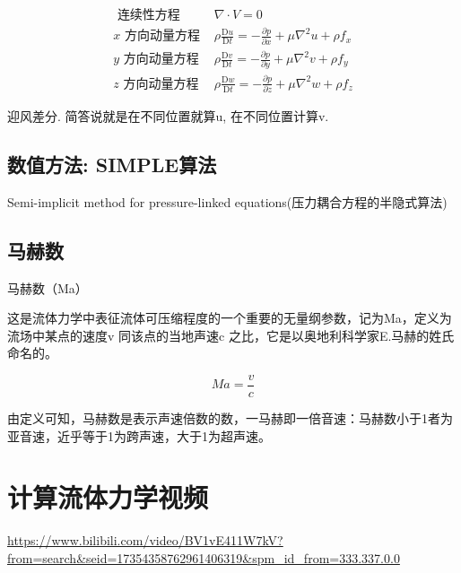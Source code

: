 $$
	\begin{array}{|lc|}
		\hline \text { 连续性方程 } & \nabla \cdot V=0                                                                                  \\
		x \text { 方向动量方程 }    & \rho \frac{\mathrm{D} u}{\mathrm{D} t}=-\frac{\partial p}{\partial x}+\mu \nabla^{2} u+\rho f_{x} \\
		y \text { 方向动量方程 }    & \rho \frac{\mathrm{D} v}{\mathrm{D} t}=-\frac{\partial p}{\partial y}+\mu \nabla^{2} v+\rho f_{y} \\
		z \text { 方向动量方程 }    & \rho \frac{\mathrm{D} w}{\mathrm{D} t}=-\frac{\partial p}{\partial z}+\mu \nabla^{2} w+\rho f_{z}
	\end{array}
$$

迎风差分. 简答说就是在不同位置就算u, 在不同位置计算v.

\subsection{数值方法: SIMPLE算法}
Semi-implicit method for pressure-linked equations(压力耦合方程的半隐式算法)


\subsection{马赫数}
马赫数（Ma）

这是流体力学中表征流体可压缩程度的一个重要的无量纲参数，记为Ma，定义为流场中某点的速度v 同该点的当地声速c 之比，它是以奥地利科学家E.马赫的姓氏命名的。

$$
	Ma = \frac{v}{c}
$$

由定义可知，马赫数是表示声速倍数的数，一马赫即一倍音速：马赫数小于1者为亚音速，近乎等于1为跨声速，大于1为超声速。

\section{计算流体力学视频}
\url{https://www.bilibili.com/video/BV1vE411W7kV?from=search&seid=17354358762961406319&spm_id_from=333.337.0.0}